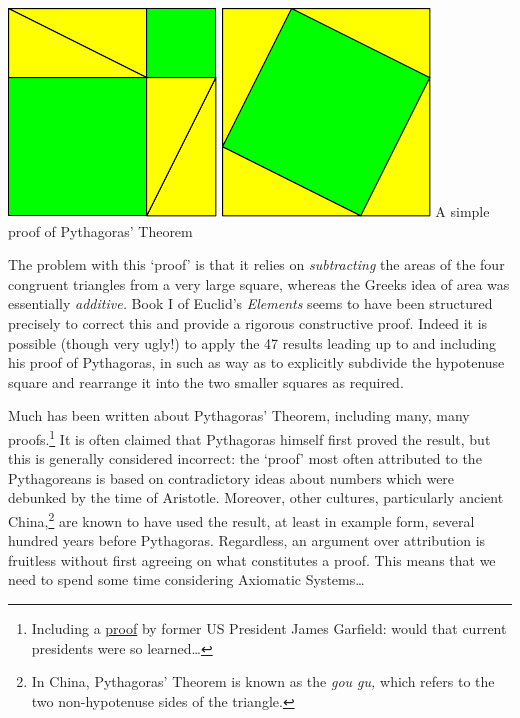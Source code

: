 \begin{center}
	\includegraphics[width=0.3\linewidth]{pythag}
	\qquad\qquad\qquad\qquad
	\includegraphics[width=0.3\linewidth]{pythag2}
	\medbreak
	A simple proof of Pythagoras' Theorem
\end{center}
The problem with this `proof' is that it relies on \emph{subtracting} the areas of the four congruent triangles from a very large square, whereas the Greeks idea of area was essentially \emph{additive.} Book I of Euclid's \emph{Elements} seems to have been structured precisely to correct this and provide a rigorous constructive proof. Indeed it is possible (though very ugly!) to apply the 47 results leading up to and including his proof of Pythagoras, in such as way as to explicitly subdivide the hypotenuse square and rearrange it into the two smaller squares as required.
\smallbreak


Much has been written about Pythagoras' Theorem, including many, many proofs.\footnote{Including a \href{https://www.maa.org/press/periodicals/convergence/mathematical-treasure-james-a-garfields-proof-of-the-pythagorean-theorem}{proof} by former US President James Garfield: would that current presidents were so learned\ldots} It is often claimed that Pythagoras himself first proved the result, but this is generally considered incorrect: the `proof' most often attributed to the Pythagoreans is based on contradictory ideas about numbers which were debunked by the time of Aristotle. Moreover, other cultures, particularly ancient China,\footnote{In China, Pythagoras' Theorem is known as the \emph{gou gu,} which refers to the two non-hypotenuse sides of the triangle.} are known to have used the result, at least in example form, several hundred years before Pythagoras. Regardless, an argument over attribution is fruitless without first agreeing on what constitutes a proof. This means that we need to spend some time considering Axiomatic Systems\ldots 


